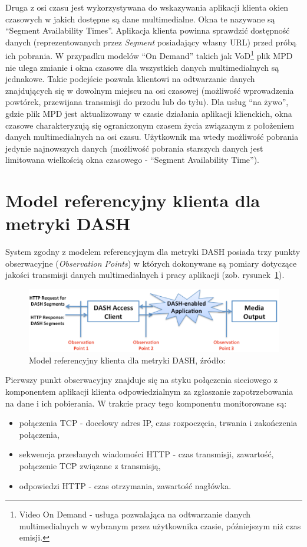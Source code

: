 Druga z osi czasu jest wykorzystywana do wskazywania aplikacji klienta okien czasowych w jakich dostępne są dane multimedialne. Okna te nazywane są ``Segment Availability Times''. Aplikacja klienta powinna sprawdzić dostępność danych (reprezentowanych przez \textit{Segment} posiadający własny URL) przed próbą ich pobrania. W przypadku modelów ``On Demand'' takich jak VoD\footnote{Video On Demand - usługa pozwalająca na odtwarzanie danych multimedialnych w wybranym przez użytkownika czasie, późniejszym niż czas emisji.} plik MPD nie ulega zmianie i okna czasowe dla wszystkich danych multimedialnych są jednakowe. Takie podejście pozwala klientowi na odtwarzanie danych znajdujących się w dowolnym miejscu na osi czasowej (możliwość wprowadzenia powtórek, przewijana transmisji do przodu lub do tyłu). Dla usług ``na żywo'', gdzie plik MPD jest aktualizowany w czasie działania aplikacji klienckich, okna czasowe charakteryzują się ograniczonym czasem życia związanym z położeniem danych multimedialnych na osi czasu. Użytkownik ma wtedy możliwość pobrania jedynie najnowszych danych (możliwość pobrania starszych danych jest limitowana wielkością okna czasowego - ``Segment Availability Time'').

\section{Model referencyjny klienta dla metryki DASH}

System zgodny z modelem referencyjnym dla metryki DASH posiada trzy punkty obserwacyjne (\textit{Observation Points}) w których dokonywane są pomiary dotyczące jakości transmisji danych multimedialnych i pracy aplikacji (zob. rysunek~\ref{fig:clientmodel}). 

\begin{figure}[h!]
	\centering
		\includegraphics[width=\linewidth]{clientmodel}
	\caption{Model referencyjny klienta dla metryki DASH, źródło:~\cite{ISO-IEC-DASH}}
	\label{fig:clientmodel}
\end{figure}

Pierwszy punkt obserwacyjny znajduje się na styku połączenia sieciowego z komponentem aplikacji klienta odpowiedzialnym za zgłaszanie zapotrzebowania na dane i ich pobierania. W trakcie pracy tego komponentu monitorowane są:
\begin{itemize}
\item połączenia TCP - docelowy adres IP, czas rozpoczęcia, trwania i zakończenia połączenia,
\item sekwencja przesłanych wiadomości HTTP - czas transmisji, zawartość, połączenie TCP związane z transmisją,
\item odpowiedzi HTTP - czas otrzymania, zawartość nagłówka.
\end{itemize}


